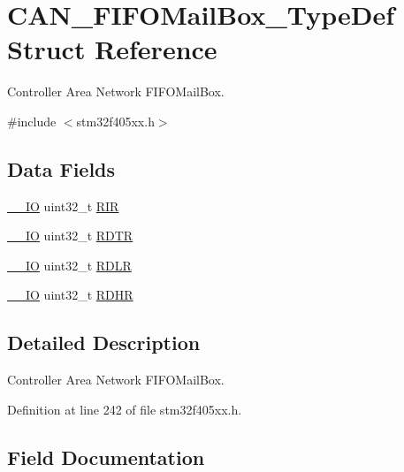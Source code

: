 \hypertarget{struct_c_a_n___f_i_f_o_mail_box___type_def}{}\section{C\+A\+N\+\_\+\+F\+I\+F\+O\+Mail\+Box\+\_\+\+Type\+Def Struct Reference}
\label{struct_c_a_n___f_i_f_o_mail_box___type_def}


Controller Area Network F\+I\+F\+O\+Mail\+Box.  




{\ttfamily \#include $<$stm32f405xx.\+h$>$}

\subsection*{Data Fields}
\begin{DoxyCompactItemize}
\item 
\hyperlink{core__sc300_8h_aec43007d9998a0a0e01faede4133d6be}{\+\_\+\+\_\+\+IO} uint32\+\_\+t \hyperlink{struct_c_a_n___f_i_f_o_mail_box___type_def_a0acc8eb90b17bef5b9e03c7ddaacfb0b}{R\+IR}
\item 
\hyperlink{core__sc300_8h_aec43007d9998a0a0e01faede4133d6be}{\+\_\+\+\_\+\+IO} uint32\+\_\+t \hyperlink{struct_c_a_n___f_i_f_o_mail_box___type_def_a9563d8a88d0db403b8357331bea83a2e}{R\+D\+TR}
\item 
\hyperlink{core__sc300_8h_aec43007d9998a0a0e01faede4133d6be}{\+\_\+\+\_\+\+IO} uint32\+\_\+t \hyperlink{struct_c_a_n___f_i_f_o_mail_box___type_def_ae1c569688eedd49219cd505b9c22121b}{R\+D\+LR}
\item 
\hyperlink{core__sc300_8h_aec43007d9998a0a0e01faede4133d6be}{\+\_\+\+\_\+\+IO} uint32\+\_\+t \hyperlink{struct_c_a_n___f_i_f_o_mail_box___type_def_a7f11f42ba9d3bc5cd4a4f5ea0214608e}{R\+D\+HR}
\end{DoxyCompactItemize}


\subsection{Detailed Description}
Controller Area Network F\+I\+F\+O\+Mail\+Box. 

Definition at line 242 of file stm32f405xx.\+h.



\subsection{Field Documentation}
